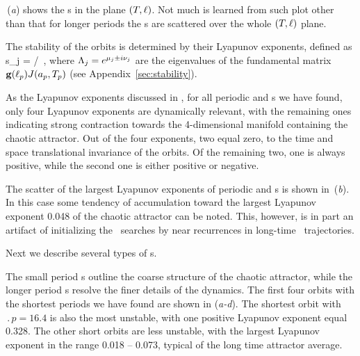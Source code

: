 \,(\textit{a}) shows the \rpo s in the plane
$(\period{},\shift)$.  Not much is learned from such plot other than
that for longer periods the \rpo s are scattered over the
whole $(\period{},\shift)$ plane.

The stability of the orbits is determined by their Lyapunov exponents,
defined as
\beq
	s_j = \eigRe[j]/ \,,
where $\ExpaEig_j = e^{\eigRe[j] \pm i \eigIm[j]}$ are the
eigenvalues of the fundamental matrix $\mathbf{g}(\shift_p)J(a_p,\period{p})$ 
(see Appendix~\ref{sec:stability}).

As  the Lyapunov exponents 
discussed in , for all
periodic and \rpo s we have found, only four Lyapunov
exponents are dynamically relevant, with the remaining ones indicating 
strong contraction towards the 4-dimensional manifold containing the chaotic attractor.  
Out of the four  exponents, two equal zero,  to
the time and space translational invariance of the orbits.  Of the
remaining two, one is always positive, while the second one is
either positive or negative.

The scatter of the largest Lyapunov exponents
of periodic and \rpo s is shown in \,(\textit{b}).
In this case some tendency of accumulation toward the largest
Lyapunov exponent 0.048 of the chaotic attractor
can be noted.  This, however, is in part an artifact of initializing
the \rpo\ searches by near recurrences in long-time \statesp\
trajectories.

Next we describe several types of \rpo s.


The small period \rpo s outline the coarse structure of the chaotic
attractor, while the longer period \rpo s resolve the finer details
of the dynamics.
The first four orbits with the shortest periods we have found are
shown in \reffig{f:ks22rpos}(\textit{a-d}).  The shortest orbit with
$\period{p} = 16.4$ is also the most unstable, with one positive
Lyapunov exponent equal 0.328.  The other short orbits are less
unstable, with the largest Lyapunov exponent %
in the range
0.018 -- 0.073, typical of the long time attractor average.

